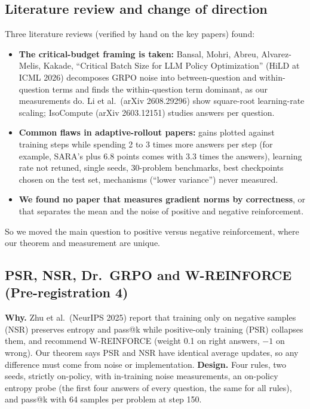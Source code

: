 \documentclass[11pt]{article}
\begin{document}
\subsection{Literature review and change of direction}
Three literature reviews (verified by hand on the key papers) found:
\begin{itemize}[leftmargin=*,itemsep=1pt]
\item \textbf{The critical-budget framing is taken:} Bansal, Mohri, Abreu, Alvarez-Melis, Kakade, ``Critical Batch Size for LLM Policy Optimization'' (HiLD at ICML 2026) decomposes GRPO noise into between-question and within-question terms and finds the within-question term dominant, as our measurements do. Li et al.\ (arXiv 2608.29296) show square-root learning-rate scaling; IsoCompute (arXiv 2603.12151) studies answers per question.
\item \textbf{Common flaws in adaptive-rollout papers:} gains plotted against training steps while spending 2 to 3 times more answers per step (for example, SARA's plus 6.8 points comes with 3.3 times the answers), learning rate not retuned, single seeds, 30-problem benchmarks, best checkpoints chosen on the test set, mechanisms (``lower variance'') never measured.
\item \textbf{We found no paper that measures gradient norms by correctness}, or that separates the mean and the noise of positive and negative reinforcement.
\end{itemize}
So we moved the main question to positive versus negative reinforcement, where our theorem and measurement are unique.

\subsection{PSR, NSR, Dr.\ GRPO and W-REINFORCE (Pre-registration 4)}
\textbf{Why.} Zhu et al.\ (NeurIPS 2025) report that training only on negative samples (NSR) preserves entropy and pass@k while positive-only training (PSR) collapses them, and recommend W-REINFORCE (weight 0.1 on right answers, $-1$ on wrong). Our theorem says PSR and NSR have identical average updates, so any difference must come from noise or implementation.
\textbf{Design.} Four rules, two seeds, strictly on-policy, with in-training noise measurements, an on-policy entropy probe (the first four answers of every question, the same for all rules), and pass@k with 64 samples per problem at step 150.
\end{document}
